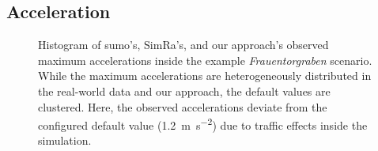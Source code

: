 \subsection{Acceleration}
\label{subsec:acceleration_evaluation}
\begin{figure}
    \vspace{-1.5em}
    \centering
    \hfill
    \caption{%
        Histogram of \ac{sumo}'s, SimRa's, and our approach's observed maximum accelerations inside the example \textit{Frauentorgraben} scenario.
        While the maximum accelerations are heterogeneously distributed in the real-world data and our approach, the default values are clustered.
        Here, the observed accelerations deviate from the configured default value (\SI{1.2}{\metre\per\square\second}) due to traffic effects inside the simulation.
    }%
    \label{fig:eval_acc}
\end{figure}

